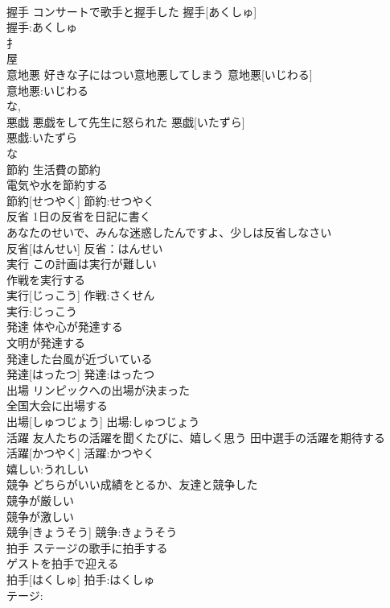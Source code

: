 \documentclass[8pt]{extreport}
\begin{document}
\begin{CJK}{UTF8}{min}
\\	握手	コンサートで歌手と握手した	握手[あくしゅ]	
\\	握手:あくしゅ
\\	扌 
\\	屋 
\\	意地悪	好きな子にはつい意地悪してしまう	意地悪[いじわる]	
\\	意地悪:いじわる
\\	な, 
\\	悪戯	悪戯をして先生に怒られた	悪戯[いたずら]	
\\	悪戯:いたずら
\\	な
\\	節約	生活費の節約 
\\	電気や水を節約する 
\\	節約[せつやく]			節約:せつやく
\\	反省	1日の反省を日記に書く 
\\	あなたのせいで、みんな迷惑したんですよ、少しは反省しなさい 
\\	反省[はんせい]			反省：はんせい
\\	実行	この計画は実行が難しい 
\\	作戦を実行する 
\\	実行[じっこう]			作戦:さくせん
\\	実行:じっこう
\\	発達	体や心が発達する 
\\	文明が発達する 
\\	発達した台風が近づいている 
\\	発達[はったつ]			発達:はったつ
\\	出場	リンピックへの出場が決まった 
\\	全国大会に出場する 
\\	出場[しゅつじょう]			出場:しゅつじょう
\\	活躍	友人たちの活躍を聞くたびに、嬉しく思う 田中選手の活躍を期待する 
\\	活躍[かつやく]			活躍:かつやく
\\	嬉しい:うれしい
\\	競争	どちらがいい成績をとるか、友達と競争した 
\\	競争が厳しい 
\\	競争が激しい 
\\	競争[きょうそう]			競争:きょうそう
\\	拍手	ステージの歌手に拍手する 
\\	ゲストを拍手で迎える 
\\	拍手[はくしゅ]			拍手:はくしゅ
\\	テージ:

\end{CJK}
\end{document}
